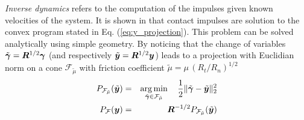 \textit{Inverse dynamics} refers to the computation of the impulses given known
velocities of the system. It is shown in \cite{bib:todorov2014} that contact
impulses are solution to the convex program stated in Eq.
(\ref{eq:y_projection}). This problem can be solved analytically using simple
geometry. By noticing that the change of variables
$\tilde{{\bm\gamma}}={\bm{R}}^{1/2}{\bm\gamma}$ (and respectively
$\tilde{{\bm{y}}}={\bm{R}}^{1/2}{\bm{y}}$) leads to a projection with Euclidian norm
on a cone $\mathcal{F}_{\tilde\mu}$ with friction coefficient
$\tilde\mu=\mu\,(R_t/R_n)^{1/2}$
\begin{eqnarray}
	P_\mathcal{F_{\tilde\mu}}(\tilde{\vf{y}})&=&\argmin_{\tilde\bgamma\in\mathcal{F_{\tilde\mu}}}
		\quad \frac{1}{2}\Vert\tilde\bgamma-\tilde{\vf{y}}\Vert_2^2\nonumber\\
	P_\mathcal{F}(\vf{y}) &=&
	\vf{R}^{-1/2}P_\mathcal{F_{\tilde\mu}}(\tilde{\vf{y}})
	\label{eq:local_optimization_problem_tilde}
\end{eqnarray}

